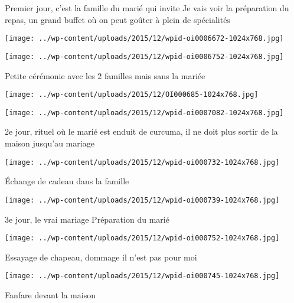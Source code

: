  Premier jour, c'est la famille du marié qui invite \newline
 Je vais voir la préparation du repas, un grand buffet où on peut goûter à plein de spécialités \newline
 \newline
\centerline{\texttt{[image: ../wp-content/uploads/2015/12/wpid-oi0006672-1024x768.jpg]} } 
 \newline
 \newline
\centerline{\texttt{[image: ../wp-content/uploads/2015/12/wpid-oi0006752-1024x768.jpg]} } 
 \newline
 Petite cérémonie avec les 2 familles mais sans la mariée \newline
 \newline
\centerline{\texttt{[image: ../wp-content/uploads/2015/12/OI000685-1024x768.jpg]} } 
 \newline
 \newline
\centerline{\texttt{[image: ../wp-content/uploads/2015/12/wpid-oi0007082-1024x768.jpg]} } 
 \newline
 2e jour, rituel où le marié est enduit de curcuma, il ne doit plus sortir de la maison jusqu'au mariage \newline
 \newline
\centerline{\texttt{[image: ../wp-content/uploads/2015/12/wpid-oi000732-1024x768.jpg]} } 
 \newline
 Échange de cadeau dans la famille \newline
 \newline
\centerline{\texttt{[image: ../wp-content/uploads/2015/12/wpid-oi000739-1024x768.jpg]} } 
 \newline
 3e jour, le vrai mariage \newline
 Préparation du marié \newline
 \newline
\centerline{\texttt{[image: ../wp-content/uploads/2015/12/wpid-oi000752-1024x768.jpg]} } 
 \newline
 Essayage de chapeau, dommage il n'est pas pour moi \newline
 \newline
\centerline{\texttt{[image: ../wp-content/uploads/2015/12/wpid-oi000745-1024x768.jpg]} } 
 \newline
 Fanfare devant la maison \newline
 \newline
